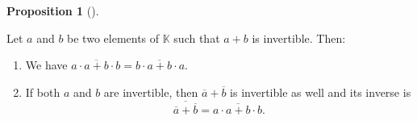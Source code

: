 \documentclass[numbers=enddot,12pt,final,onecolumn,notitlepage]{scrartcl}%
\theoremstyle{definition}
\newtheorem{prop}[theo]{Proposition}
\newenvironment{proposition}[1][]
{\begin{prop}[#1]\begin{leftbar}}
{\end{leftbar}\end{prop}}
\begin{document}
\begin{proposition}
\label{prop.inverses.a+b}Let $a$ and $b$ be two elements of $\mathbb{K}$ such
that $a+b$ is invertible. Then:

\begin{enumerate}
\item[\textbf{(a)}] We have $a\cdot\overline{a+b}\cdot b=b\cdot\overline
{a+b}\cdot a$.

\item[\textbf{(b)}] If both $a$ and $b$ are invertible, then $\overline
{a}+\overline{b}$ is invertible as well and its inverse is%
\[
\overline{\overline{a}+\overline{b}}=a\cdot\overline{a+b}\cdot b.
\]

\end{enumerate}
\end{proposition}
\end{document}

